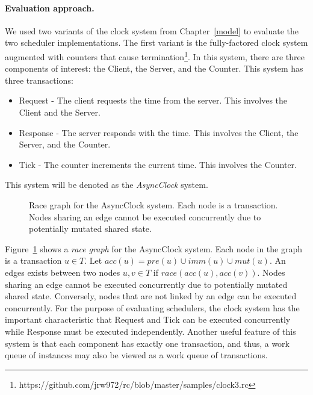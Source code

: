 \paragraph{Evaluation approach.}
We used two variants of the clock system from Chapter~\ref{model} to evaluate the two scheduler implementations.
The first variant is the fully-factored clock system augmented with counters that cause termination\footnote{https://github.com/jrw972/rc/blob/master/samples/clock3.rc}.
In this system, there are three components of interest:  the Client, the Server, and the Counter.
This system has three transactions:
\begin{itemize}
  \item Request - The client requests the time from the server.  This involves the Client and the Server.
  \item Response - The server responds with the time.  This involves the Client, the Server, and the Counter.
  \item Tick - The counter increments the current time.  This involves the Counter.
\end{itemize}
This system will be denoted as the \emph{AsyncClock} system.

\begin{figure}
\centering
{}%
\caption{Race graph for the AsyncClock system.  Each node is a transaction.  Nodes sharing an edge cannot be executed concurrently due to potentially mutated shared state. \label{clock_system_mutex}}
\end{figure}

Figure~\ref{clock_system_mutex} shows a \emph{race graph} for the AsyncClock system.
Each node in the graph is a transaction $u \in T$.
Let $\mathit{acc}(u) = \mathit{pre}(u) \cup \mathit{imm}(u) \cup \mathit{mut}(u)$.
An edges exists between two nodes $u,v \in T$ if $\mathit{race}(\mathit{acc}(u), \mathit{acc}(v))$.
Nodes sharing an edge cannot be executed concurrently due to potentially mutated shared state.
Conversely, nodes that are not linked by an edge can be executed concurrently.
For the purpose of evaluating schedulers, the clock system has the important characteristic that Request and Tick can be executed concurrently while Response must be executed independently.
Another useful feature of this system is that each component has exactly one transaction, and thus, a  work queue of instances may also be viewed as a work queue of transactions.

